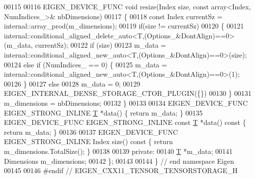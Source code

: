 \begin{DoxyCode}
00115 
00116     EIGEN\_DEVICE\_FUNC \textcolor{keywordtype}{void} resize(Index size, \textcolor{keyword}{const} array<Index, NumIndices\_>& nbDimensions)
00117     \{
00118       \textcolor{keyword}{const} Index currentSz = internal::array\_prod(m\_dimensions);
00119       \textcolor{keywordflow}{if}(size != currentSz)
00120       \{
00121         internal::conditional\_aligned\_delete\_auto<T,(Options\_&DontAlign)==0>(m\_data, currentSz);
00122         \textcolor{keywordflow}{if} (size)
00123           m\_data = internal::conditional\_aligned\_new\_auto<T,(Options\_&DontAlign)==0>(size);
00124         \textcolor{keywordflow}{else} \textcolor{keywordflow}{if} (NumIndices\_ == 0) \{
00125       m\_data = internal::conditional\_aligned\_new\_auto<T,(Options\_&DontAlign)==0>(1);
00126     \}
00127     \textcolor{keywordflow}{else} 
00128           m\_data = 0;
00129         EIGEN\_INTERNAL\_DENSE\_STORAGE\_CTOR\_PLUGIN(\{\})
00130       \}
00131       m\_dimensions = nbDimensions;
00132     \}
00133 
00134     EIGEN\_DEVICE\_FUNC EIGEN\_STRONG\_INLINE \hyperlink{group___sparse_core___module_class_eigen_1_1_triplet}{T} *data() \{ \textcolor{keywordflow}{return} m\_data; \}
00135     EIGEN\_DEVICE\_FUNC EIGEN\_STRONG\_INLINE \textcolor{keyword}{const} \hyperlink{group___sparse_core___module_class_eigen_1_1_triplet}{T} *data()\textcolor{keyword}{ const }\{ \textcolor{keywordflow}{return} m\_data; \}
00136 
00137     EIGEN\_DEVICE\_FUNC EIGEN\_STRONG\_INLINE Index size()\textcolor{keyword}{ const }\{ \textcolor{keywordflow}{return} m\_dimensions.TotalSize(); \}
00138 
00139  \textcolor{keyword}{private}:
00140   \hyperlink{group___sparse_core___module_class_eigen_1_1_triplet}{T} *m\_data;
00141   Dimensions m\_dimensions;
00142 \};
00143 
00144 \} \textcolor{comment}{// end namespace Eigen}
00145 
00146 \textcolor{preprocessor}{#endif // EIGEN\_CXX11\_TENSOR\_TENSORSTORAGE\_H}
\end{DoxyCode}
